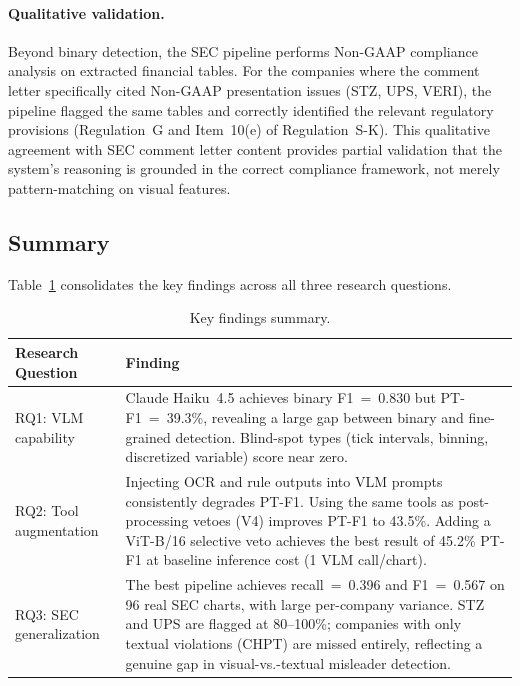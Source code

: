 \paragraph{Qualitative validation.}
Beyond binary detection, the SEC pipeline performs Non-GAAP compliance analysis on extracted financial tables. For the companies where the comment letter specifically cited Non-GAAP presentation issues (STZ, UPS, VERI), the pipeline flagged the same tables and correctly identified the relevant regulatory provisions (Regulation~G and Item~10(e) of Regulation~S-K). This qualitative agreement with SEC comment letter content provides partial validation that the system's reasoning is grounded in the correct compliance framework, not merely pattern-matching on visual features.

\subsection{Summary}
\label{sec:summary}

Table~\ref{tab:summary} consolidates the key findings across all three research questions.

\begin{table}[h]
  \centering
  \caption{Key findings summary.}
  \label{tab:summary}
  \small
  \begin{tabular}{p{3cm}p{9cm}}
    \toprule
    Research Question & Finding \\
    \midrule
    RQ1: VLM capability & Claude Haiku~4.5 achieves binary F1~=~0.830 but PT-F1~=~39.3\%, revealing a large gap between binary and fine-grained detection. Blind-spot types (tick intervals, binning, discretized variable) score near zero. \\
    \midrule
    RQ2: Tool augmentation & Injecting OCR and rule outputs into VLM prompts consistently degrades PT-F1. Using the same tools as post-processing vetoes (V4) improves PT-F1 to 43.5\%. Adding a ViT-B/16 selective veto achieves the best result of 45.2\% PT-F1 at baseline inference cost (1 VLM call/chart). \\
    \midrule
    RQ3: SEC generalization & The best pipeline achieves recall~=~0.396 and F1~=~0.567 on 96 real SEC charts, with large per-company variance. STZ and UPS are flagged at 80--100\%; companies with only textual violations (CHPT) are missed entirely, reflecting a genuine gap in visual-vs.-textual misleader detection. \\
    \bottomrule
  \end{tabular}
\end{table}
